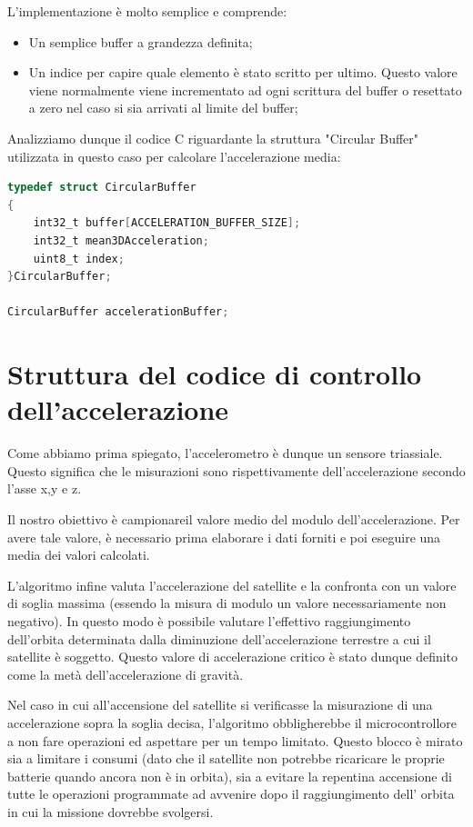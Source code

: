 \documentclass[LaM,binding=0.6cm]{../sapthesis}
\begin{document}
L'implementazione è molto semplice e comprende:
\begin{itemize}
    \item Un semplice buffer a grandezza definita;
    
    \item Un indice per capire quale elemento è stato scritto per ultimo. Questo valore viene normalmente viene incrementato ad ogni scrittura del buffer o resettato a zero nel caso si sia arrivati al limite del buffer;
\end{itemize}

\newline

Analizziamo dunque il codice C riguardante la struttura "Circular Buffer" utilizzata in questo caso per calcolare l'accelerazione media:

\begin{lstlisting}[language=C]
typedef struct CircularBuffer
{
    int32_t buffer[ACCELERATION_BUFFER_SIZE];
    int32_t mean3DAcceleration;
    uint8_t index;
}CircularBuffer;

CircularBuffer accelerationBuffer;
\end{lstlisting}

\section{Struttura del codice di controllo dell'accelerazione}
Come abbiamo prima spiegato, l'accelerometro è dunque un sensore triassiale. Questo significa che  le misurazioni sono rispettivamente dell'accelerazione secondo l'asse x,y e z.

Il nostro obiettivo è campionareil valore medio del modulo dell’accelerazione. Per avere tale valore, è necessario prima elaborare i dati forniti e poi eseguire una media dei valori calcolati. 

L’algoritmo infine valuta l’accelerazione del satellite e la confronta con un valore di soglia massima (essendo la misura di modulo un valore necessariamente non negativo).
In questo modo è possibile valutare l’effettivo raggiungimento dell’orbita determinata dalla diminuzione dell’accelerazione terrestre a cui il satellite è soggetto. Questo valore di accelerazione critico è stato dunque definito come la metà dell'accelerazione di gravità.

Nel caso in cui all’accensione del satellite si verificasse la misurazione di una accelerazione sopra la soglia decisa, l'algoritmo obbligherebbe il microcontrollore a non fare operazioni ed aspettare per un tempo limitato. Questo blocco è mirato sia a limitare i consumi (dato che il satellite non potrebbe ricaricare le proprie batterie quando ancora non è in orbita), sia a evitare la repentina accensione di tutte le operazioni programmate ad avvenire dopo il raggiungimento dell’ orbita in cui la missione dovrebbe svolgersi. 
\end{document}
